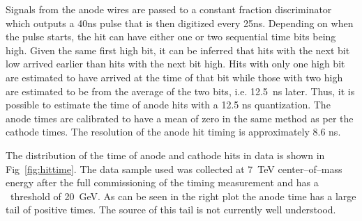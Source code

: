 Signals from the anode wires are passed to a constant fraction discriminator which outputs a 40ns pulse
that is then digitized every 25ns. Depending on when the pulse starts, the hit can have either one or two sequential time bits being high. Given the same
first high bit, it can be inferred that hits with the next bit low arrived earlier than hits with the next bit high.
Hits with only one high bit are estimated to have arrived at the time of that bit while those with two high are estimated to be from the average of the two bits, i.e. 12.5~ns
later.
Thus, it is possible to estimate the time of anode hits with a 12.5 ns quantization. The anode times are calibrated to have a mean of zero in the same method as
per the cathode times. The resolution of the anode hit timing is approximately 8.6 ns.


The distribution of the time of anode and cathode hits in data is shown in Fig~\ref{fig:hittime}.
The data sample used was collected at 7~TeV center--of--mass energy after the full commissioning of the timing measurement and has a \pt\ threshold of 20~GeV.
As can be seen in the right plot the anode time has a large tail of positive times. The source of this tail is not currently well understood.

